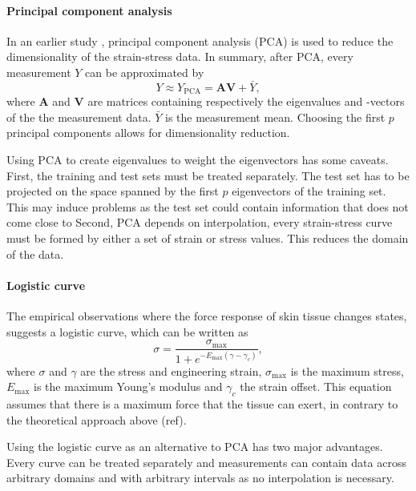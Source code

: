 \paragraph{Principal component analysis}
In an earlier study \cite{Soylu2022}, principal component analysis (PCA) is used to reduce the dimensionality of the strain-stress data.
In summary, after PCA, every measurement $Y$ can be approximated by
\begin{equation}\label{eq:pca}
    Y \approx Y_\mathrm{PCA} = \mathbf{A} \mathbf{V} + \bar{Y},
\end{equation}
where $\mathbf{A}$ and $\mathbf{V}$ are matrices containing respectively the eigenvalues and -vectors of the the measurement data.
$\bar{Y}$ is the measurement mean.
Choosing the first $p$ principal components allows for dimensionality reduction.

Using PCA to create eigenvalues to weight the eigenvectors has some caveats.
First, the training and test sets must be treated separately.
The test set has to be projected on the space spanned by the first $p$ eigenvectors of the training set.
This may induce problems as the test set could contain information that does not come close to
Second, PCA depends on interpolation, \ie every strain-stress curve must be formed by either a set of strain or stress values.
This reduces the domain of the data.

\paragraph{Logistic curve}
The empirical observations where the force response of skin tissue changes states, suggests a logistic curve, which can be written as
\begin{equation}\label{eq:logistic_curve}
    \sigma = \frac{\sigma_\mathrm{max}}{1+e^{-E_\mathrm{max} (\gamma - \gamma_c)}},
\end{equation}
where $\sigma$ and $\gamma$ are the stress and engineering strain, $\sigma_\mathrm{max}$ is the maximum stress, $E_\mathrm{max}$ is the maximum Young's modulus and $\gamma_c$ the strain offset.
This equation assumes that there is a maximum force that the tissue can exert, in contrary to the theoretical approach above (ref).

Using the logistic curve as an alternative to PCA has two major advantages.
Every curve can be treated separately and measurements can contain data across arbitrary domains and with arbitrary intervals as no interpolation is necessary.

